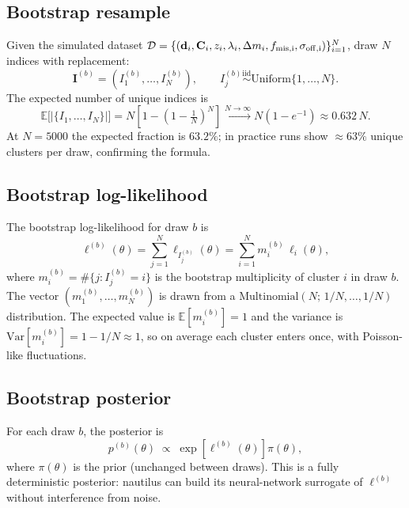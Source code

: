 \documentclass[11pt,a4paper]{article}
\begin{document}
\subsection{Bootstrap resample}

Given the simulated dataset
$\mathcal{D} = \{(\mathbf{d}_i, \mathbf{C}_i, z_i, \lambda_i, \Delta m_i,
f_{\rm mis,i}, \sigma_{\rm off,i})\}_{i=1}^{N}$,
draw $N$ indices with replacement:
\begin{equation}
  \mathbf{I}^{(b)} = (I_1^{(b)}, \ldots, I_N^{(b)}),
  \qquad
  I_j^{(b)} \overset{\mathrm{iid}}{\sim} \mathrm{Uniform}\{1,\ldots,N\}.
\end{equation}
The expected number of unique indices is
\begin{equation}
  \mathbb{E}\bigl[|\{I_1,\ldots,I_N\}|\bigr]
  = N\left[1 - \left(1-\tfrac{1}{N}\right)^N\right]
  \xrightarrow{N\to\infty} N(1 - e^{-1}) \approx 0.632\,N.
\end{equation}
At $N=5000$ the expected fraction is $63.2\%$; in practice runs show
$\approx 63\%$ unique clusters per draw, confirming the formula.

\subsection{Bootstrap log-likelihood}

The bootstrap log-likelihood for draw $b$ is
\begin{equation}
  \ell^{(b)}(\theta)
  = \sum_{j=1}^{N} \ell_{I_j^{(b)}}(\theta)
  = \sum_{i=1}^{N} m_i^{(b)}\,\ell_i(\theta),
\end{equation}
where $m_i^{(b)} = \#\{j : I_j^{(b)} = i\}$ is the bootstrap multiplicity
of cluster $i$ in draw $b$.  The vector $(m_1^{(b)},\ldots,m_N^{(b)})$ is
drawn from a $\mathrm{Multinomial}(N;\,1/N,\ldots,1/N)$ distribution.  The
expected value is $\mathbb{E}[m_i^{(b)}]=1$ and the variance is
$\mathrm{Var}[m_i^{(b)}] = 1 - 1/N \approx 1$, so on average each cluster
enters once, with Poisson-like fluctuations.

\subsection{Bootstrap posterior}

For each draw $b$, the posterior is
\begin{equation}
  p^{(b)}(\theta)
  \;\propto\;
  \exp\!\left[\ell^{(b)}(\theta)\right]\pi(\theta),
\end{equation}
where $\pi(\theta)$ is the prior (unchanged between draws).  This is a
fully deterministic posterior: nautilus can build its neural-network
surrogate of $\ell^{(b)}$ without interference from noise.
\end{document}
